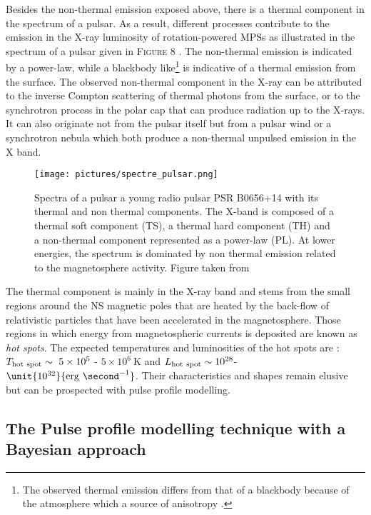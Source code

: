 \documentclass[a4paper, twoside, 12pt]{article}
\numberwithin{equation}{section}
\begin{document}
Besides the non-thermal emission exposed above, there is a thermal component in the spectrum of a pulsar. As a result, different processes contribute to the emission in the X-ray luminosity of rotation-powered MPSs as illustrated in the spectrum of a pulsar given in F\textsc{igure}  8%
. The non-thermal emission  is indicated by a power-law, while a blackbody like\footnote{The observed thermal emission differs from that of a blackbody because of the atmosphere which a source of anisotropy \cite{HotSpots}.} is indicative of a thermal emission from the surface. The observed non-thermal component in the  X-ray can be attributed to the inverse Compton scattering of thermal photons from the surface, or to the synchrotron process in the polar cap that can produce radiation up to the X-rays. It can also originate not from the pulsar itself but from a pulsar wind or a synchrotron nebula which both produce a non-thermal unpulsed emission in the X band\cite{becker_RotationPoweredNS}.\\
\begin{figure}[!h]
\centering
\texttt{[image: pictures/spectre\_pulsar.png]}
\caption[Spectrum of PSR B0656+14]{Spectra of a pulsar a young radio pulsar PSR B0656+14 with its thermal and non thermal components. The X-band is composed of a thermal soft component (TS), a thermal hard component (TH) and a non-thermal component represented as a power-law (PL). At lower energies, the spectrum is dominated by non thermal emission related to the magnetosphere activity. Figure taken from \cite{becker}}
\label{fig: spectra}
\end{figure}

The thermal component is mainly in the X-ray band and stems from the small regions around the NS magnetic poles that are heated  by the back-flow of relativistic particles that have been accelerated in the magnetosphere. Those regions in which energy from magnetospheric currents is deposited are known as {\itshape{hot spots}}. The expected temperatures and luminosities of the hot spots are\cite{polar_cap_model} : $T_{\rm{hot \ spot}} \sim \ 5 \times 10^5$ - $5 \times 10^6 \ $K and  $L_{\rm{hot \  spot}} \sim 10^{28}$-$\unit{10^{32}}{  \rm{erg} \ \second^{-1}}$. 
Their characteristics and shapes remain elusive but can be prospected  with pulse profile modelling. 
\newpage

\subsection{The Pulse profile modelling technique with a Bayesian approach}
\label{subsec: PulseProfileTechnique}
\end{document}
